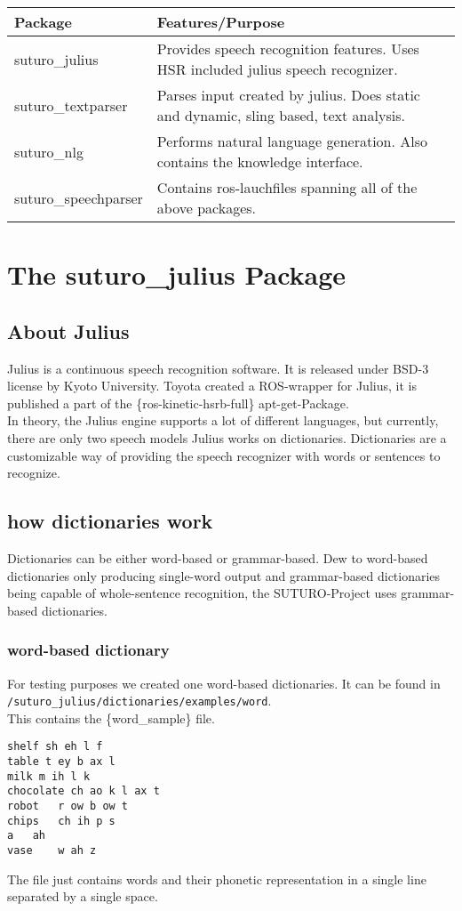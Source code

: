 \documentclass[main.tex]{subfiles}
\begin{document}
    \begin{tabular}{|l|p{9cm}|}
        \hline
        \textbf{Package} & \textbf{Features/Purpose} \\
        \hline
        suturo\_julius & Provides speech recognition features. Uses HSR included julius speech recognizer. \\
        \hline 
        suturo\_textparser & Parses input created by julius. Does static and dynamic, sling based, text analysis. \\
        \hline
        suturo\_nlg & Performs natural language generation. Also contains the knowledge interface. \\
        \hline 
        suturo\_speechparser & Contains ros-lauchfiles spanning all of the above packages.\\
        \hline
    \end{tabular}

\newpage
\section{The suturo\_julius Package}

    \subsection{About Julius}
      Julius is a continuous speech recognition software. It is released under BSD-3 license by Kyoto University. Toyota created a ROS-wrapper for Julius, it is published a part of the \{ros-kinetic-hsrb-full\} apt-get-Package.\\
      In theory, the Julius engine supports a lot of different languages, but currently, there are only two speech models
     Julius works on dictionaries. Dictionaries are a customizable way of providing the speech recognizer with words or sentences to recognize.
    \subsection{how dictionaries work}
      Dictionaries can be either word-based or grammar-based. Dew to word-based dictionaries only producing single-word output and grammar-based dictionaries being capable of whole-sentence recognition, the SUTURO-Project uses grammar-based dictionaries.
    
        \subsubsection{word-based dictionary}
            For testing purposes we created one word-based dictionaries. It can be found in \lstinline|/suturo_julius/dictionaries/examples/word|.\\
            This contains the \{word\_sample\} file.\\
            \begin{lstlisting}
shelf sh eh l f
table t ey b ax l
milk m ih l k
chocolate ch ao k l ax t
robot	r ow b ow t
chips	ch ih p s
a	ah
vase	w ah z
            \end{lstlisting}
            The file just contains words and their phonetic representation in a single line separated by a single space.
            
\end{document}
